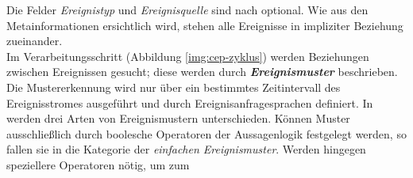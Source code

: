 \documentclass{acm_proc_article-sp}
\begin{document}
\begin{table}[H]
    \caption{Ereignisaufbau}
    \label{table:ereignis}\vspace{0.2cm}
\end{table}
Die Felder \textit{Ereignistyp} und \textit{Ereignisquelle} sind  nach \cite{bruns} 
optional. Wie aus den Metainformationen ersichtlich wird, stehen alle
Ereignisse in impliziter Beziehung zueinander.\\
Im Verarbeitungsschritt (Abbildung \ref{img:cep-zyklus}) werden Beziehungen zwischen 
Ereignissen gesucht; diese werden durch \textbf{\textit{Ereignismuster}} beschrieben. Die 
Mustererkennung wird nur über ein bestimmtes Zeitintervall des Ereignisstromes 
ausgeführt und durch Ereignisanfragesprachen definiert. In \cite{bruns} werden drei Arten 
von Ereignismustern unterschieden. Können Muster ausschließlich durch boolesche 
Operatoren der Aussagenlogik festgelegt werden, so fallen sie in die Kategorie der 
\textit{einfachen Ereignismuster}. Werden hingegen speziellere Operatoren nötig, um zum 
\end{document}

